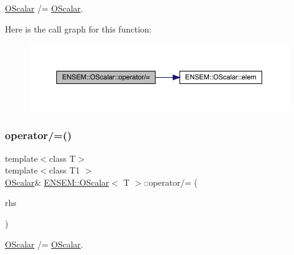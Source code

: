 \mbox{\hyperlink{classENSEM_1_1OScalar}{O\+Scalar}} /= \mbox{\hyperlink{classENSEM_1_1OScalar}{O\+Scalar}}. 

Here is the call graph for this function\+:
\nopagebreak
\begin{figure}[H]
\begin{center}
\leavevmode
\includegraphics[width=350pt]{da/d80/classENSEM_1_1OScalar_a1e0517e29754a8acb284c3ac266c2b2c_cgraph}
\end{center}
\end{figure}
\mbox{\label{classENSEM_1_1OScalar_a1e0517e29754a8acb284c3ac266c2b2c}} 
\subsubsection{\texorpdfstring{operator/=()}{operator/=()}\hspace{0.1cm}{\footnotesize\ttfamily [3/3]}}
{\footnotesize\ttfamily template$<$class T$>$ \\
template$<$class T1 $>$ \\
\mbox{\hyperlink{classENSEM_1_1OScalar}{O\+Scalar}}\& \mbox{\hyperlink{classENSEM_1_1OScalar}{E\+N\+S\+E\+M\+::\+O\+Scalar}}$<$ T $>$\+::operator/= (\begin{DoxyParamCaption}\item[{const \mbox{\hyperlink{classENSEM_1_1OScalar}{O\+Scalar}}$<$ T1 $>$ \&}]{rhs }\end{DoxyParamCaption})\hspace{0.3cm}{\ttfamily [inline]}}



\mbox{\hyperlink{classENSEM_1_1OScalar}{O\+Scalar}} /= \mbox{\hyperlink{classENSEM_1_1OScalar}{O\+Scalar}}. 

